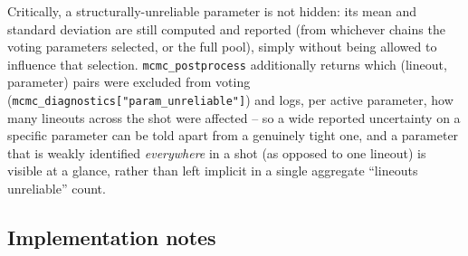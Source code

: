 \documentclass[11pt]{article}
\newcommand{\code}[1]{\texttt{#1}}
\begin{document}
Critically, a structurally-unreliable parameter is not hidden: its mean and standard
deviation are still computed and reported (from whichever chains the voting parameters
selected, or the full pool), simply without being allowed to influence that selection.
\code{mcmc\_postprocess} additionally returns which (lineout, parameter) pairs were
excluded from voting (\code{mcmc\_diagnostics["param\_unreliable"]}) and logs, per active
parameter, how many lineouts across the shot were affected -- so a wide reported
uncertainty on a specific parameter can be told apart from a genuinely tight one, and a
parameter that is weakly identified \emph{everywhere} in a shot (as opposed to one lineout)
is visible at a glance, rather than left implicit in a single aggregate ``lineouts
unreliable'' count.

\subsection{Implementation notes}\label{sec:uq-impl}
\end{document}
